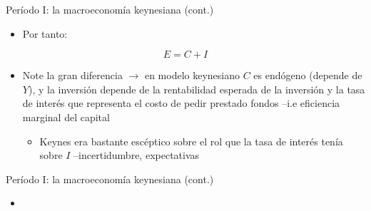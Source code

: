 \documentclass[
  ignorenonframetext,
]{beamer}
\providecommand{\tightlist}{%
  \setlength{\itemsep}{0pt}\setlength{\parskip}{0pt}}\usepackage{longtable,booktabs,array}
\begin{document}
\begin{frame}{Período I: la macroeconomía keynesiana (cont.)}
\protect\hypertarget{peruxedodo-i-la-macroeconomuxeda-keynesiana-cont.-1}{}
\begin{itemize}
\tightlist
\item
  Por tanto:
\end{itemize}

\begin{equation}
E=C+I 
\end{equation}

\begin{itemize}
\tightlist
\item
  Note la gran diferencia \(\longrightarrow\) en modelo keynesiano \(C\)
  es endógeno (depende de \(Y\)), y la inversión depende de la
  rentabilidad esperada de la inversión y la tasa de interés que
  representa el costo de pedir prestado fondos --i.e eficiencia marginal
  del capital

  \begin{itemize}
  \tightlist
  \item
    Keynes era bastante escéptico sobre el rol que la tasa de interés
    tenía sobre \(I\) --incertidumbre, expectativas
  \end{itemize}
\end{itemize}
\end{frame}

\begin{frame}{Período I: la macroeconomía keynesiana (cont.)}
\protect\hypertarget{peruxedodo-i-la-macroeconomuxeda-keynesiana-cont.-2}{}
\begin{itemize}
\tightlist
\item
\end{itemize}
\end{frame}
\end{document}
